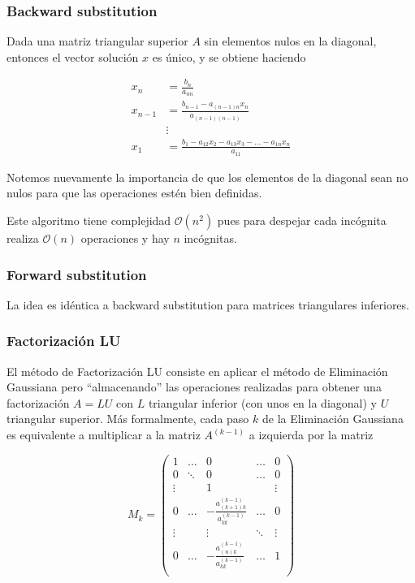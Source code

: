 \subsubsection{Backward substitution}
Dada una matriz triangular superior $A$ sin elementos nulos en la diagonal, entonces el vector solución $x$ es único, y se obtiene haciendo

\begin{align*}
x_n &= \frac{b_n}{a_{nn}}	\\
x_{n - 1} &= \frac{b_{n - 1} - a_{(n-1)n} x_n}{a_{(n-1)(n-1)}}	\\
&\vdots \\
x_1 &= \frac{b_1 - a_{12}x_2 - a_{13}x_3 - \ldots - a_{1n} x_n}{a_{11}}
\end{align*}

Notemos nuevamente la importancia de que los elementos de la diagonal sean no nulos para que las operaciones estén bien definidas.

Este algoritmo tiene complejidad $\mathcal{O}(n^2)$ pues para despejar cada incógnita realiza $\mathcal{O}(n)$ operaciones y hay $n$ incógnitas.

\subsubsection{Forward substitution}
La idea es idéntica a backward substitution para matrices triangulares inferiores.

\subsubsection{Factorización LU}

El método de Factorización LU consiste en aplicar el método de Eliminación Gaussiana pero ``almacenando'' las operaciones realizadas para obtener una factorización $A = LU$ con $L$ triangular inferior (con unos en la diagonal) y $U$ triangular superior. Más formalmente, cada paso $k$ de la Eliminación Gaussiana es equivalente a multiplicar a la matriz $A^{(k-1)}$ a izquierda por la matriz

\[
M_k = 
\begin{pmatrix} 
1 		& \ldots 	& 0 				& \ldots 	& 0 \\
0 		& \ddots 	& 0 				& \ldots 	& 0 \\
\vdots 	& 			& 1 				& 			& \vdots\\
0		& \ldots		& -\frac{a_{(k+1)k}^{(k - 1)}}{a_{kk}^{(k - 1)}} 	& \ldots		& 0\\
\vdots	& 			& \vdots		 	& \ddots		& \vdots\\
0		& \ldots		& -\frac{a_{(n)k}^{(k - 1)}}{a_{kk}^{(k - 1)}}	& \ldots		& 1\\
\end{pmatrix}
\]

